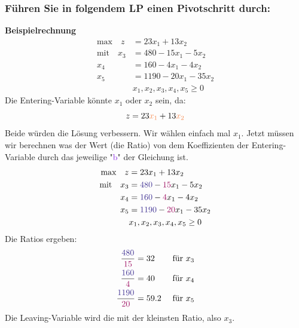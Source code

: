 \documentclass{article}
\begin{document}
\subsubsection{Führen Sie in folgendem  LP einen Pivotschritt durch:}
\begin{definitionbox}[title=Entering und Leaving Variables]

\end{definitionbox}
\textbf{Beispielrechnung} \newline
\begin{align*}
\text{max} \quad z &= 23x_1 + 13x_2 \\
\text{mit} \quad x_3 &= 480 - 15x_1 - 5x_2 \\
x_4 &= 160 - 4x_1 - 4x_2 \\
x_5 &= 1190 - 20x_1 - 35x_2 \\
& x_1, x_2, x_3, x_4, x_5  \geq 0
\end{align*}
Die Entering-Variable könnte $x_1$ oder $x_2$ sein, da: 
\[
z = 23\textcolor{Peach}{x_1} + 13\textcolor{Peach}{x_2 }
\]
Beide würden die Lösung verbessern. Wir wählen einfach mal $x_1$.\newline
Jetzt müssen wir berechnen was der Wert (die Ratio) von dem \textcolor{RedViolet}{Koeffizienten} der Entering-Variable durch das jeweilige "\textcolor{BlueViolet}{b}" der Gleichung ist. 
\begin{align*}
\text{max} \quad z &= 23x_1 + 13x_2 \\
\text{mit} \quad x_3 &= \textcolor{BlueViolet}{480} - \textcolor{RedViolet}{15}x_1 - 5x_2 \\
x_4 &= \textcolor{BlueViolet}{160} - \textcolor{RedViolet}{4}x_1 - 4x_2 \\
x_5 &= \textcolor{BlueViolet}{1190} - \textcolor{RedViolet}{20}x_1 - 35x_2 \\
& x_1, x_2, x_3, x_4, x_5  \geq 0
\end{align*}
Die Ratios ergeben:
\begin{align*}
    \frac{\textcolor{BlueViolet}{480}}{\textcolor{RedViolet}{15}} & = 32 & \text{ für } x_3\\
    \frac{\textcolor{BlueViolet}{160}}{\textcolor{RedViolet}{4}} & = 40 & \text{ für } x_4 \\
    \frac{\textcolor{BlueViolet}{1190}}{\textcolor{RedViolet}{20}} & = 59.2 & \text{ für } x_5 \\
\end{align*}
Die Leaving-Variable wird die mit der kleinsten Ratio, also $x_3$. \newline
\end{document}

